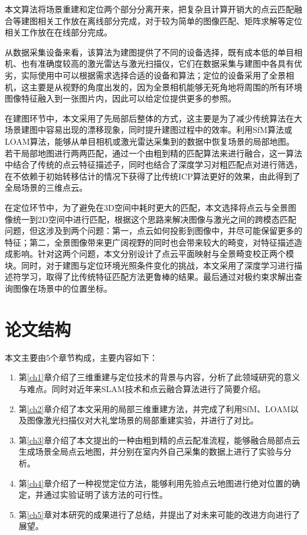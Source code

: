 本文算法将场景重建和定位两个部分分离开来，把复杂且计算开销大的点云匹配融合等建图相关工作放在离线部分完成，对于较为简单的图像匹配、矩阵求解等定位相关工作放在在线部分完成。

从数据采集设备来看，该算法为建图提供了不同的设备选择，既有成本低的单目相机、也有准确度较高的激光雷达与激光扫描仪，它们在数据采集与建图中各具有优劣，实际使用中可以根据需求选择合适的设备和算法；定位的设备采用了全景相机，这主要是从视野的角度出发的，因为全景相机能够无死角地将周围的所有环境图像特征融入到一张图片内，因此可以给定位提供更多的参照。

在建图环节中，本文采用了先局部后整体的方式，这主要是为了减少传统算法在大场景建图中容易出现的漂移现象，同时提升建图过程中的效率。利用SfM算法或LOAM算法，能够从单目相机或激光雷达采集到的数据中恢复场景的局部地图。若干局部地图进行两两匹配，通过一个由粗到精的匹配算法来进行融合，这一算法中结合了传统的点云特征描述子，同时也结合了深度学习对粗匹配点对进行筛选，在不依赖于初始转移估计的情况下获得了比传统ICP算法更好的效果，由此得到了全局场景的三维点云。

在定位环节中，为了避免在3D空间中耗时更大的匹配，本文选择将点云与全景图像统一到2D空间中进行匹配，根据这个思路来解决图像与激光之间的跨模态匹配问题，但这涉及到两个问题：第一，点云如何投影到图像中，并尽可能保留更多的特征；第二，全景图像带来更广阔视野的同时也会带来较大的畸变，对特征描述造成影响。针对这两个问题，本文分别设计了点云平面映射与全景畸变校正两个模块。同时，对于建图与定位环境光照条件变化的挑战，本文采用了深度学习进行描述符学习，取得了比传统特征匹配方法更鲁棒的结果。最后通过对极约束求解出查询图像在场景中的位置坐标。

\section{论文结构}
本文主要由5个章节构成，主要内容如下：
\begin{enumerate}
	\item 第\ref{ch1}章介绍了三维重建与定位技术的背景与内容，分析了此领域研究的意义与难点。同时对近年来SLAM技术和点云融合算法进行了简要介绍。
	\item 第\ref{ch2}章介绍了本文采用的局部三维重建方法，并完成了利用SfM、LOAM以及图像激光扫描仪对大礼堂场景的局部重建实验，并进行了对比。
	\item 第\ref{ch3}章介绍了本文提出的一种由粗到精的点云配准流程，能够融合局部点云生成场景全局点云地图，并分别在室内外自己采集的数据上进行了实验与分析。
	\item 第\ref{ch4}章介绍了一种视觉定位方法，能够利用先验点云地图进行绝对位置的确定，并通过实验证明了该方法的可行性。
	\item 第\ref{ch5}章对本研究的成果进行了总结，并提出了对未来可能的改进方向进行了展望。
\end{enumerate}




